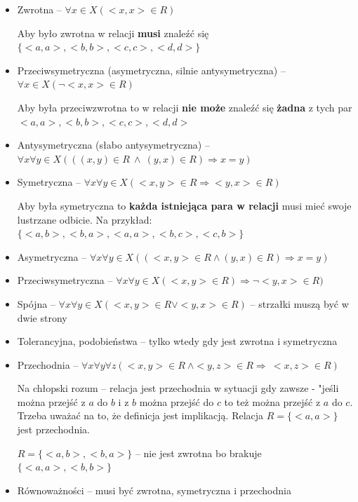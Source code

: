 \begin{itemize}
    \item Zwrotna -- $\forall x \in X (<x,x> \in R)$
    
    Aby było zwrotna w relacji \textbf{musi} znaleźć się $ \{ <a, a>, <b, b>, <c, c>, <d, d> \} $

    \item Przeciwsymetryczna (asymetryczna, silnie antysymetryczna) -- $\forall x \in X(\neg <x, x> \in R) $
    
    Aby była przeciwzwrotna to w relacji \textbf{nie może} znaleźć się \textbf{żadna} z tych par \linebreak 
    $ <a, a>, <b,b>, <c,c>, <d,d> $

    \item Antysymetryczna (słabo antysymetryczna) -- $ \forall x \forall y \in X(((x, y) \in R \ \land \ (y, x) \in R) \Rightarrow x = y) $
    
    \item Symetryczna -- $ \forall x \forall y \in X(<x,y> \in R \Rightarrow <y,x> \in R) $
    
    Aby była symetryczna to \textbf{każda istniejąca para w relacji} musi mieć swoje lustrzane odbicie. Na przykład:
    $ \{ <a,b>, <b,a>, <a, a>, <b,c>, <c,b> \} $

    \item Asymetryczna -- $\forall x \forall y \in X((<x,y> \in R \land (y,x) \in R) \Rightarrow x=y) $
    
    \item Przeciwsymetryczna -- $\forall x \forall y \in X(<x,y> \in R) \Rightarrow \neg <y,x> \in R) $
    
    \item Spójna -- $\forall x \forall y \in X(< x, y >\in R \lor < y, x >\in R) $ -- strzałki muszą być w dwie strony
    
    \item Tolerancyjna, podobieństwa -- tylko wtedy gdy jest zwrotna i symetryczna
    
    \item Przechodnia -- $\forall x \forall y \forall z (<x,y> \in R \ \land <y,z> \in R \Rightarrow \ <x,z> \in R)$
    
    Na chłopski rozum -- relacja jest przechodnia w sytuacji gdy zawsze - "jeśli można przejść z $a$ do $b$ i z $b$ można przejść do $c$
    to też można przejść z $a$ do $c$. Trzeba uważać na to, że definicja jest implikacją. Relacja $ R = \{ <a,a> \} $ jest przechodnia.

    $ R = \{ <a,b>, <b,a> \} $ -- nie jest zwrotna bo brakuje $ \{ <a,a>, <b,b> \} $

    \item Równoważności -- musi być zwrotna, symetryczna i przechodnia
\end{itemize}

